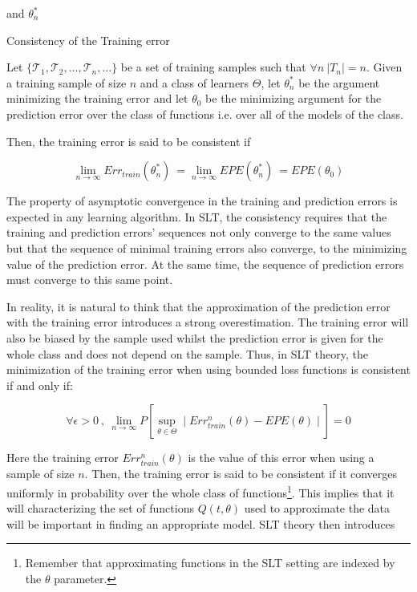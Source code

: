 and $\theta^{*}_n$


\begin{definition}{Consistency of the Training error}
	
	Let $\{\mathcal {T}_1, \mathcal {T}_2, ..., \mathcal {T}_n, ...  \}$ be a set of training samples such that $\forall n \ |T_n|=n$. Given a training sample of size $n$ and a class of learners $\Theta$, let $\theta^{*}_n$ be the argument minimizing the training error and let $\theta_0$ be the minimizing argument for the prediction error over the class of functions i.e. over all of the models of the class.
	
	Then, the training error is said to be consistent if 
	
	$$\lim_{n\to\infty} Err_{train}(\theta^{*}_n) \  = \lim_{n\to\infty} EPE(\theta^{*}_n) \ =  EPE(\theta_0)$$

\end{definition}

The property of asymptotic convergence in the training and prediction errors is expected in any learning algorithm. In SLT, the consistency requires that the training and prediction errors'  sequences not only converge to the same values but that the sequence of minimal training errors also converge, to the minimizing value of the prediction error. At the same time, the sequence of prediction errors must converge to this same point. 

In reality, it is natural to think that the approximation of the prediction error with the training error introduces a strong overestimation. The training error will also be biased by the sample used whilst the prediction error is given for the whole class and does not depend on the sample. Thus, in SLT theory, the minimization of the training error when using bounded loss functions is consistent if and only if:

		
$$\forall \epsilon > 0 \ , \ \lim_{n\to\infty} P\left[ \sup_{\theta \in \Theta} \mid Err^{n}_{train}(\theta)  - EPE(\theta) \mid \right]  = 0 $$  %


	Here the training error $Err^{n}_{train}(\theta)$ is the value of this error when using a sample of size $n$. Then, the training error is said to be consistent if it converges uniformly in probability over the whole class of functions\footnote{Remember that approximating functions in the SLT setting are indexed by the $\theta$ parameter.}. This implies that it will characterizing the set of functions $Q(t,\theta)$ used to approximate the data will be important in finding an appropriate model. SLT theory then introduces 
	
